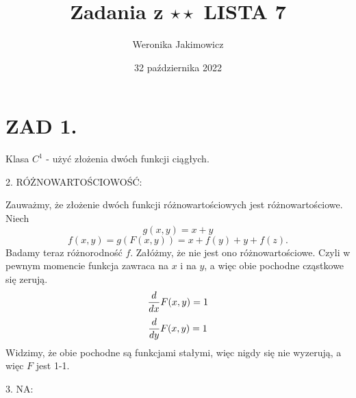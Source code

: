 \documentclass{article}[13pt]
\author{Weronika Jakimowicz}
\title{Zadania z $\star\star$ LISTA 7}
\date{32 października 2022}
\begin{document}
\maketitle

\section*{ZAD 1.}
Klasa $C^1$ - użyć złożenia dwóch funkcji ciągłych.
\medskip

{\color{red}2. RÓŻNOWARTOŚCIOWOŚĆ:}
\medskip

Zauważmy, że złożenie dwóch funkcji różnowartościowych jest różnowartościowe. Niech 
$$g(x,y)=x+y$$
$$f(x,y)=g(F(x,y))=x+f(y)+y+f(z).$$
Badamy teraz różnorodność $f$. Załóżmy, że nie jest ono różnowartościowe. Czyli w pewnym momencie funkcja zawraca na $x$ i na $y$, a więc obie pochodne cząstkowe się zerują.
$${d\over dx}F(x,y)=1$$
$${d\over dy}F(x,y)=1$$
Widzimy, że obie pochodne są funkcjami stałymi, więc nigdy się nie wyzerują, a więc $F$ jest 1-1.

{\color{red}3. NA:}
\medskip
\end{document}
